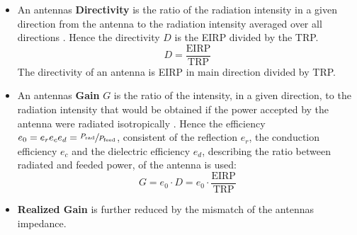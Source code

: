 \begin{itemize}
\item An antennas \textbf{Directivity} is \glqq the ratio of the radiation intensity in a given direction from the antenna to the radiation intensity averaged over all directions\grqq{} \cite{ieeeantenna}. Hence the directivity $D$ is the \ac{EIRP} divided by the \ac{TRP}.
\begin{equation}
D = \frac{\text{EIRP}}{\text{TRP}}
\end{equation}
The directivity of an antenna is \ac{EIRP} in main direction divided by \ac{TRP}.
\item An antennas \textbf{Gain} $G$ is \glqq the ratio of the intensity, in a given direction, to the radiation intensity that would be obtained if the power accepted by the antenna were radiated isotropically\grqq{} \cite{ieeeantenna}. Hence the efficiency $e_0=e_re_ce_d=\sfrac{P_\text{rad}}{P_\text{feed}}$, consistent of the reflection $e_r$, the conduction efficiency $e_c$ and the dielectric efficiency $e_d$, describing the ratio between radiated and feeded power, of the antenna is used:
\begin{equation}
G = e_0\cdot D=e_0\cdot\frac{\text{EIRP}}{\text{TRP}}
\end{equation}
\item \textbf{Realized Gain} is further reduced by the mismatch of the antennas impedance. \cite{ieeeantenna}
\end{itemize}


